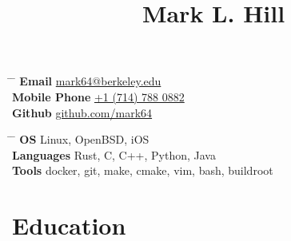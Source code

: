 \documentclass[10pt]{article} %
\begin{document}

\title{Mark L. Hill} %


\parbox{0.5\textwidth}{ %
\begin{tabbing} %
\hspace{2.5cm} \= \hspace{4cm} \= \kill %
{\bf Email} \> \href{mailto:mark64@berkeley.edu}{mark64@berkeley.edu} \\ %
{\bf Mobile Phone} \> \href{tel:+17147880882}{+1 (714) 788 0882} \\ %
{\bf Github} \> \href{https://github.com/mark64} {github.com/mark64} %
\end{tabbing}}
\hfill %
\parbox{0.5\textwidth}{ %
\begin{tabbing} %
\hspace{2.5cm} \= \hspace{4cm} \= \kill %
{\bf OS} \> Linux, OpenBSD, iOS \\
{\bf Languages} \> Rust, C, C++, Python, Java \\
{\bf Tools} \> docker, git, make, cmake, vim, bash, buildroot
\end{tabbing}}



\section{Education}
\end{document}
